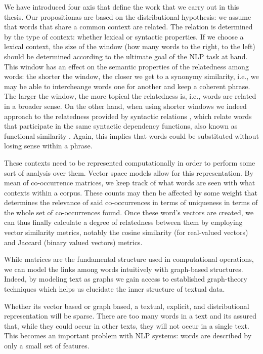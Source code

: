 We have introduced four axis that define the work that we carry out in this thesis. Our propositionas are based on the distributional hypothesis: we assume that words that share a common context are related. The relation is determined by the type of context: whether lexical or syntactic properties. If we choose a lexical context, the size of the window (how many words to the right, to the left) should be determined according to the ultimate goal of the NLP task at hand. This window has an effect on the semantic properties of the relatedness among words: the shorter the window, the closer we get to a synonymy similarity, i.e., we may be able to intercheange words one for another and keep a coherent phrase. The larger the window, the more topical the relatedness is, i.e., words are related in a broader sense. On the other hand, when using shorter windows we indeed approach to the relatedness provided by syntactic relations \cite{sahlgren2006word}, which relate words that participate in the same syntactic dependency functions, also known as functional similarity \cite{LevyG14}. Again, this implies that words could be substituted without losing sense within a phrase.

These contexts need to be represented computationally in order to perform some sort of analysis over them. Vector space models allow for this representation. By mean of co-occurrence matrices, we keep track of what words are seen with what contexts within a corpus. These counts may then be affected by some weight that determines the relevance of said co-occurrences in terms of uniqueness in terms of the whole set of co-occurrences found. Once these word's vectors are created, we can thus finally calculate a degree of relatedness between them by employing vector similarity metrics, notably the cosine similarity (for real-valued vectors) and Jaccard (binary valued vectors) metrics.

While matrices are the fundamental structure used in computational operations, we can model the links among words intuitively with graph-based structures. Indeed, by modeling text as graphs we gain access to  established graph-theory techniques which helps us elucidate the inner structure of textual data. 	

Whether its vector based or graph based, a textual, explicit, and distributional representation will be sparse. There are too many words in a text and its assured that, while they could occur in other texts, they will not occur in a single text. This becomes an important problem with NLP systems: words are described by only a small set of features. 



